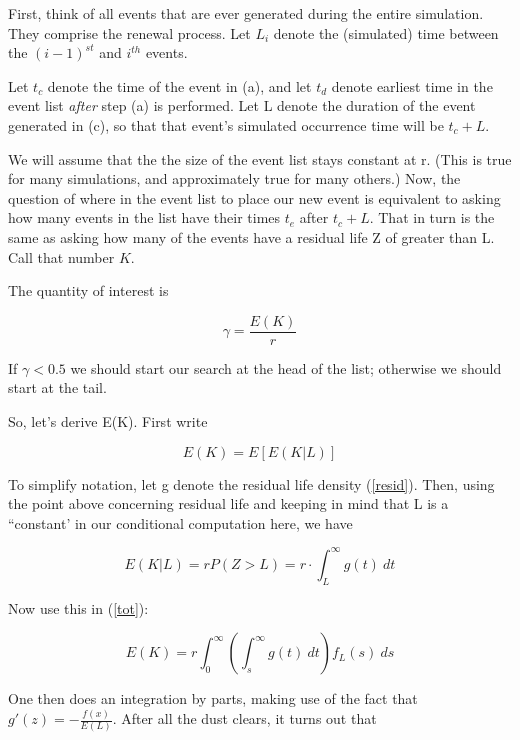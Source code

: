First, think of all events that are ever generated during the entire
simulation.  They comprise the renewal process.  Let $L_i$ denote the
(simulated) time between the $(i-1)^{st}$ and $i^{th}$ events.

Let $t_c$ denote the time of the event in (a), and let $t_d$ denote
earliest time in the event list {\it after} step (a) is performed.  Let
L denote the duration of the event generated in (c), so that that
event's simulated occurrence time will be $t_c + L$.

We will assume that the the size of the event list stays constant at r.
(This is true for many simulations, and approximately true for many
others.) Now, the question of where in the event list to place our new
event is equivalent to asking how many events in the list have their
times $t_e$ after $t_c+L$.  That in turn is the same as asking how many
of the events have a residual life Z of greater than L.  Call that number
$K$.  

The quantity of interest is 

\begin{equation}
\gamma = \frac{E(K)}{r}
\end{equation}

If $\gamma < 0.5$ we should start our search at the head of the list;
otherwise we should start at the tail.

So, let's derive E(K).  First write

\begin{equation}
\label{tot}
E(K) = E [ E(K|L) ]
\end{equation}

To simplify notation, let g denote the residual life density
(\ref{resid}).  Then, using the point above concerning residual life
and keeping in mind that L is a ``constant' in our conditional
computation here, we have

\begin{equation}
E(K|L) = r P(Z > L) 
= r \cdot \int_{L}^{\infty} g(t) ~ dt
\end{equation}

Now use this in (\ref{tot}):

\begin{equation}
E(K) = r \int_{0}^{\infty} 
\left ( \int_{s}^{\infty} g(t) ~ dt \right )
f_L(s) ~ ds
\end{equation}

One then does an integration by parts, making use of the fact that
$g\prime (z) = -\frac{f(x)}{E(L)}$.  After all the dust clears, it turns
out that 

